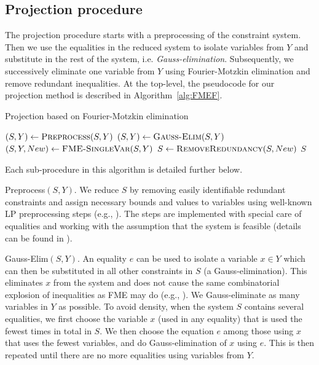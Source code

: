 \documentclass{llncs}
\begin{document}
\subsection{Projection procedure}\label{sec:projMethod}
The projection procedure starts with a preprocessing of the constraint system.
Then we use the equalities in the reduced system to isolate variables from $Y$ and substitute in the rest of the system, i.e. \emph{Gauss-elimination}.  
Subsequently, we successively eliminate one variable from $Y$ using Fourier-Motzkin elimination and remove redundant inequalities. At the top-level, the pseudocode for our projection method is described in Algorithm~\ref{alg:FMEF}. 
\setlength{\floatsep}{10pt} %
\setlength{\textfloatsep}{14pt} %
\begin{algorithm}[b!]
\caption{Projection based on Fourier-Motzkin elimination} 
\label{alg:FMEF}
\begin{algorithmic}
	\State $(S,Y)\gets \Call{Preprocess}{S,Y}$
	\State $(S,Y)\gets\Call{Gauss-Elim}{S,Y}$
		\State $(S, Y, New )\gets\Call{FME-SingleVar}{S,Y}$
		\State $S\gets\Call{RemoveRedundancy}{S,New}$
	\EndWhile
	\State \Return $S$
\EndFunction
\end{algorithmic}
\end{algorithm}
Each sub-procedure in this algorithm is detailed further below. 

{\sc Preprocess}$(S,Y)$. We reduce $S$ by removing easily identifiable redundant constraints and assign necessary bounds and values to variables using well-known LP preprocessing steps (e.g., \cite{andersen95}). The steps are implemented with special care of equalities and working with the assumption that the system is feasible (details can be found in \cite{mytechrep}).

{\sc Gauss-Elim}$(S,Y)$. An equality $e$ can be used to isolate a variable $ x\in Y$ which can then be substituted in all other constraints in $S$ (a Gauss-elimination). This eliminates $x$ from the system and does not cause the same combinatorial explosion of inequalities as FME may do (e.g., \cite{duffin74,simon05}). We Gauss-eliminate as many variables in $Y$ as possible. To avoid density, when the system $S$ contains several equalities, we first choose the variable $x$ (used in any equality) that is used the fewest times in total in $S$. We then choose the equation $e$ among those using $x$ that uses the fewest variables, and do Gauss-elimination of $x$ using $e$. This is then repeated until there are no more equalities using variables from $Y$.
\end{document}
